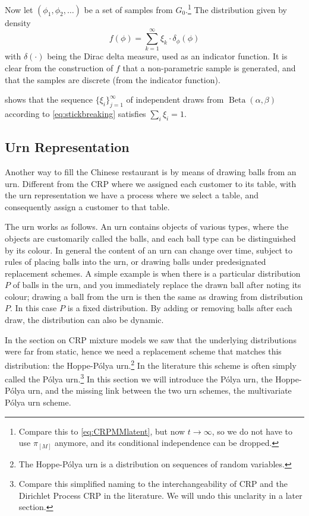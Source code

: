 Now let $(\phi_1, \phi_2, \ldots)$ be a set of samples from $G_0$.\footnote{Compare this to \cref{eq:CRPMMlatent}, but now $t\rightarrow\infty$, so we do not have to use $\pi_{[M]}$ anymore, and its conditional independence can be dropped.} The distribution given by density 
\begin{equation}
	f(\phi) = \sum_{k=1}^\infty \xi_k \cdot \delta_{\phi}(\phi) 
\end{equation}
with $\delta(\cdot)$ being the Dirac delta measure, used as an indicator function. It is clear from the construction of $f$ that a non-parametric sample is generated, and that the samples are discrete (from the indicator function).

\textcite{Sethuraman1994A} shows that the sequence $\{\xi_i\}_{j=1}^\infty$  of independent draws from $\operatorname{Beta}(\alpha,\beta)$ according to \cref{eq:stickbreaking} satisfies $\sum_{i} \xi_i = 1$.



\subsection{Urn Representation}
Another way to fill the Chinese restaurant is by means of drawing balls from an urn. Different from the CRP where we assigned each customer to its table, with the urn representation we have a process where we select a table, and consequently assign a customer to that table.

The urn works as follows. An urn contains objects of various types, where the objects are customarily called the balls, and each ball type can be distinguished by its colour. In general the content of an urn can change over time, subject to rules of placing balls into the urn, or drawing balls under predesignated replacement schemes. A simple example is when there is a particular distribution $P$ of balls in the urn, and you immediately replace the drawn ball after noting its colour; drawing a ball from the urn is then the same as drawing from distribution $P$. In this case $P$ is a fixed distribution. By adding or removing balls after each draw, the distribution can also be dynamic.

In the section on CRP mixture models we saw that the underlying distributions were far from static, hence we need a replacement scheme that matches this distribution: the Hoppe-P\'olya urn.\footnote{The Hoppe-P\'olya urn is a distribution on sequences of random variables.} In the literature this scheme is often simply called the P\'olya urn.\footnote{Compare this simplified naming to the interchangeability of CRP and the Dirichlet Process CRP in the literature. We will undo this unclarity in a later section.} In this section we will introduce the P\'olya urn, the Hoppe-P\'olya urn, and the missing link between the two urn schemes, the multivariate P\'olya urn scheme.

